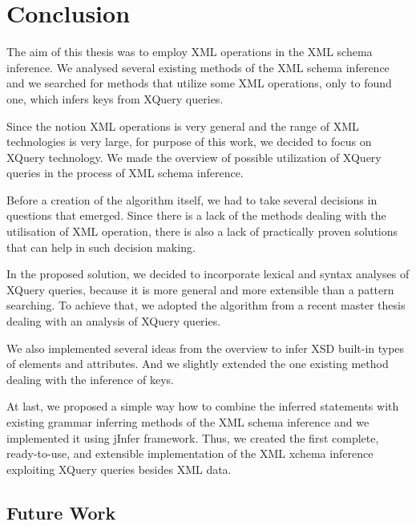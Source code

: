 \chapter{Conclusion}
The aim of this thesis was to employ XML operations in the XML schema inference. We analysed several existing methods of the XML schema inference and we searched for methods that utilize some XML operations, only to found one, which infers keys from XQuery queries.

Since the notion XML operations is very general and the range of XML technologies is very large, for purpose of this work, we decided to focus on XQuery technology. We made the overview of possible utilization of XQuery queries in the process of XML schema inference.

Before a creation of the algorithm itself, we had to take several decisions in questions that emerged. Since there is a lack of the methods dealing with the utilisation of XML operation, there is also a lack of practically proven solutions that can help in such decision making.

In the proposed solution, we decided to incorporate lexical and syntax analyses of XQuery queries, because it is more general and more extensible than a pattern searching. To achieve that, we adopted the algorithm from a recent master thesis dealing with an analysis of XQuery queries.

We also implemented several ideas from the overview to infer XSD built-in types of elements and attributes. And we slightly extended the one existing method dealing with the inference of keys. 

At last, we proposed a simple way how to combine the inferred statements with existing grammar inferring methods of the XML schema inference and we implemented it using jInfer framework. Thus, we created the first complete, ready-to-use, and extensible implementation of the XML xchema inference exploiting XQuery queries besides XML data.

\section{Future Work}
